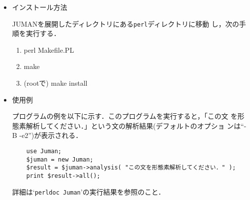 \documentclass[a4j,titlepage]{jarticle}
\begin{document}
\begin{itemize}
 \item インストール方法

       JUMANを展開したディレクトリにある\texttt{perl}ディレクトリに移動
       し，次の手順を実行する．
       \begin{enumerate}
	\item perl Makefile.PL
	\item make
	\item (rootで) make install
       \end{enumerate}
 \item 使用例

       プログラムの例を以下に示す．このプログラムを実行すると，「この文
       を形態素解析してください．」という文の解析結果(デフォルトのオプショ
       ンは``-B -e2'')が表示される．

       \begin{verbatim}
	use Juman;
	$juman = new Juman;
	$result = $juman->analysis( "この文を形態素解析してください．" );
	print $result->all();
       \end{verbatim}

       詳細は`\texttt{perldoc Juman}'の実行結果を参照のこと．
\end{itemize}

\begin{thebibliography}{88)}





\end{thebibliography}
\end{document}
